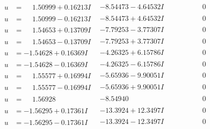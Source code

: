 \documentclass[1p]{elsarticle_modified}
\theoremstyle{definition}
\begin{document}
$$\begin{array}{c|c|c}
\begin{aligned}
u &= \phantom{-}1.50999 + 0.16213 I\end{aligned}
 & -8.54473 - 4.64532 I & \phantom{-0.000000 } 0 \\ \hline\begin{aligned}
u &= \phantom{-}1.50999 - 0.16213 I\end{aligned}
 & -8.54473 + 4.64532 I & \phantom{-0.000000 } 0 \\ \hline\begin{aligned}
u &= \phantom{-}1.54653 + 0.13709 I\end{aligned}
 & -7.79253 - 3.77307 I & \phantom{-0.000000 } 0 \\ \hline\begin{aligned}
u &= \phantom{-}1.54653 - 0.13709 I\end{aligned}
 & -7.79253 + 3.77307 I & \phantom{-0.000000 } 0 \\ \hline\begin{aligned}
u &= -1.54628 + 0.16369 I\end{aligned}
 & -4.26325 + 6.15786 I & \phantom{-0.000000 } 0 \\ \hline\begin{aligned}
u &= -1.54628 - 0.16369 I\end{aligned}
 & -4.26325 - 6.15786 I & \phantom{-0.000000 } 0 \\ \hline\begin{aligned}
u &= \phantom{-}1.55577 + 0.16994 I\end{aligned}
 & -5.65936 - 9.90051 I & \phantom{-0.000000 } 0 \\ \hline\begin{aligned}
u &= \phantom{-}1.55577 - 0.16994 I\end{aligned}
 & -5.65936 + 9.90051 I & \phantom{-0.000000 } 0 \\ \hline\begin{aligned}
u &= \phantom{-}1.56928\phantom{ +0.000000I}\end{aligned}
 & -8.54940\phantom{ +0.000000I} & \phantom{-0.000000 } 0 \\ \hline\begin{aligned}
u &= -1.56295 + 0.17361 I\end{aligned}
 & -13.3924 + 12.3497 I & \phantom{-0.000000 } 0 \\ \hline\begin{aligned}
u &= -1.56295 - 0.17361 I\end{aligned}
 & -13.3924 - 12.3497 I & \phantom{-0.000000 } 0 \\ \hline\begin{aligned}

\end{aligned}
\end{array}$$
\end{document}
